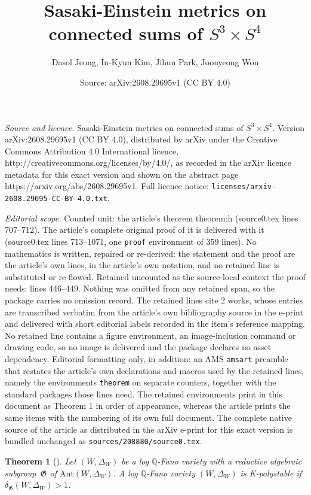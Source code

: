 \documentclass[10pt,a4paper]{amsart}
\title{Sasaki-Einstein metrics on connected sums of $S^3\times S^4$}
\author{Dasol Jeong, In-Kyun Kim, Jihun Park, Joonyeong Won}
\date{Source: arXiv:2608.29695v1 (CC BY 4.0)}
\newtheorem{theorem}{Theorem}
\begin{document}
\maketitle

\noindent\emph{Source and licence.} Sasaki-Einstein metrics on connected sums of $S^3\times S^4$. Version arXiv:2608.29695v1 (CC BY 4.0), distributed by arXiv under the Creative Commons Attribution 4.0 International licence, http://creativecommons.org/licenses/by/4.0/, as recorded in the arXiv licence metadata for this exact version and shown on the abstract page https://arxiv.org/abs/2608.29695v1. Full licence notice: \texttt{licenses/arxiv-2608.29695-CC-BY-4.0.txt}.\par\smallskip

\noindent\textit{Editorial scope.} Counted unit: the article's theorem theorem:h (source0.tex lines 707--712). The article's complete original proof of it is delivered with it (source0.tex lines 713--1071, one \texttt{proof} environment of 359 lines). No mathematics is written, repaired or re-derived: the statement and the proof are the article's own lines, in the article's own notation, and no retained line is substituted or re-flowed.  Retained uncounted as the source-local context the proof needs: lines 446--449.  Nothing was omitted from any retained span, so the package carries no omission record.  The retained lines cite 2 works, whose entries are transcribed verbatim from the article's own bibliography source in the e-print and delivered with short editorial labels recorded in the item's reference mapping.  No retained line contains a figure environment, an image-inclusion command or drawing code, so no image is delivered and the package declares no asset dependency.  Editorial formatting only, in addition: an AMS \texttt{amsart} preamble that restates the article's own declarations and macros used by the retained lines, namely the environments \texttt{theorem} on separate counters, together with the standard packages those lines need.  The retained environments print in this document as Theorem 1 in order of appearance, whereas the article prints the same items with the numbering of its own full document.  The complete native source of the article as distributed in the arXiv e-print for this exact version is bundled unchanged as \texttt{sources/208880/source0.tex}.
\begin{theorem}[{\cite[Corollary~4.14]{Z21}}]\label{theorem:G-delta}
Let $(W, \Delta_W)$ be a  log $\mathbb{Q}$-Fano variety with a reductive algebraic subgroup~$\mathfrak{G}$ of $\mathrm{Aut}(W, \Delta_W)$.
A log $\mathbb{Q}$-Fano variety $(W, \Delta_W)$ is K-polystable  if $\delta_\mathfrak{G}(W, \Delta_W)>1$.
\end{theorem}
\end{document}
